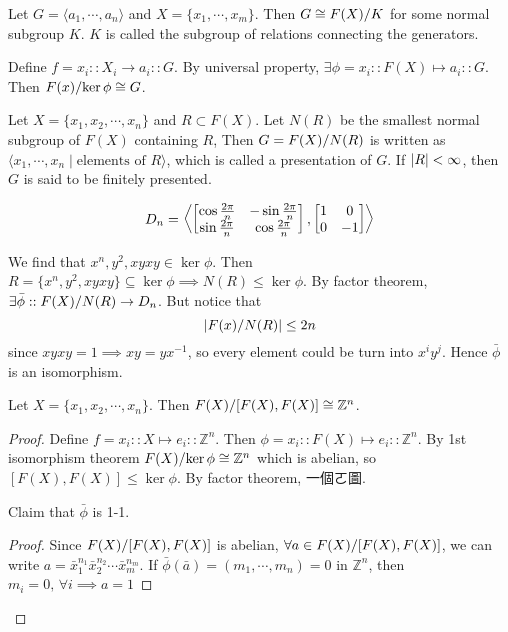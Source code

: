 \begin{prop}
  Let $G = \langle a_1, \cdots , a_n \rangle$ and $X = \{ x_1, \cdots, x_m \}$. Then
  $G \cong \quot{F(X)}{K}$ for some normal subgroup $K$. $K$ is called the subgroup of relations
  connecting the generators.

  Define $f = x_i :: X_i \to a_i :: G$. By universal property, $\exists \phi
  = x_i :: F(X) \mapsto a_i :: G$. Then
  $\quot{F(x)}{\ker \phi} \cong G$.
\end{prop}

\begin{definition}
  Let $X = \{x_1, x_2, \cdots, x_n\}$ and $R \subset F(X)$.
  Let $N(R)$ be the smallest normal subgroup of $F(X)$ containing $R$,
  Then $G = \quot{F(X)}{N(R)}$ is written as $\langle x_1, \cdots, x_n \mid \text{elements of } R \rangle$,
  which is called a presentation of $G$. If $\abs{R} < \infty$, then $G$ is said to be finitely
  presented.
\end{definition}

\begin{example}
  \[ D_n = \gen*{
    \begin{bmatrix}
      \cos \frac{2\pi}{n} & -\sin \frac{2\pi}{n} \\
      \sin \frac{2\pi}{n} &  \cos \frac{2\pi}{n}
    \end{bmatrix},
    \begin{bmatrix}
      1 & 0 \\
      0 & -1
    \end{bmatrix}
    }
  \]

  We find that $x^n , y^2 , xyxy \in \ker \phi$. Then $R = \{ x^n , y^2 , xyxy \} \subseteq \ker \phi
  \implies N(R) \leq \ker \phi$.  By factor theorem, $\exists \bar{\phi} :: \quot{F(X)}{N(R)} \to D_n$.
  But notice that
  \[ \abs*{\quot{F(x)}{N(R)}}  \leq 2n \]
  since $xyxy = 1 \implies xy = yx^{-1}$, so every element could be turn into
  $x^i y^j$. Hence $\bar{\phi}$ is an isomorphism.
\end{example}

\begin{prop}
  Let $X = \{x_1, x_2, \cdots, x_n\}$. Then $\quot{F(X)}{[F(X), F(X)]} \cong \mathbb{Z}^n$.
\end{prop}

\begin{proof}
  Define $f = x_i :: X \mapsto e_i :: \mathbb{Z}^n$. Then $\phi = x_i :: F(X) \mapsto e_i :: \mathbb{Z}^n$.
  By 1st isomorphism theorem $\quot{F(X)}{\ker \phi} \cong \mathbb{Z}^n$ which is abelian,
  so $[F(X), F(X)] \leq \ker \phi$.
  By factor theorem, 一個ㄛ圖.

  Claim that $\bar{\phi}$ is 1-1.
  \begin{proof}
    Since $\quot{F(X)}{[F(X), F(X)]}$ is abelian, $\forall a \in \quot{F(X)}{[F(X), F(X)]}$, we can write
    $a = \bar{x}_1^{n_1} \bar{x}_2^{n_2} \cdots \bar{x}_m^{n_m}$.
    If $\bar{\phi}(\bar{a}) = (m_1, \cdots, m_n) = 0$ in $\mathbb{Z}^n$, then $m_i = 0,\, \forall i
    \implies a = 1$
  \end{proof}
\end{proof}

